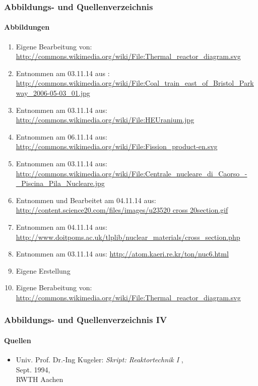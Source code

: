 \documentclass{beamer}[9pt]
\begin{document}
\begin{frame}[allowframebreaks]
\frametitle{Abbildungs- und Quellenverzeichnis}
\framesubtitle{Abbildungen}

  \begin{enumerate}
     \item Eigene Bearbeitung von:\\
     \url{http://commons.wikimedia.org/wiki/File:Thermal_reactor_diagram.svg}
     \item Entnommen am 03.11.14 aus : \\
     \url{http://commons.wikimedia.org/wiki/File:Coal_train_east_of_Bristol_Parkway_2006-05-03_01.jpg}
     \item Entnommen am 03.11.14 aus:\\
     \url{http://commons.wikimedia.org/wiki/File:HEUranium.jpg}
     \item Entnommen am 06.11.14 aus:
     \url{http://commons.wikimedia.org/wiki/File:Fission_product-en.svg}
     \item Entnommen am 03.11.14 aus:\\
     \url{http://commons.wikimedia.org/wiki/File:Centrale_nucleare_di_Caorso_-_Piscina_Pila_Nucleare.jpg}
     \item Entnommen und Bearbeitet am 04.11.14 aus:\\
     \url{http://content.science20.com/files/images/u23520 cross 20section.gif}
     \item Entnommen am 04.11.14 aus:
     \url{http://www.doitpoms.ac.uk/tlplib/nuclear_materials/cross_section.php}
     \item Entnommen am 03.11.14 aus:
     \url{http://atom.kaeri.re.kr/ton/nuc6.html}
     \item Eigene Erstellung
     \item Eigene Berabeitung von:
     \url{http://commons.wikimedia.org/wiki/File:Thermal_reactor_diagram.svg}
  \end{enumerate}
\end{frame}
\begin{frame}
\frametitle{Abbildungs- und Quellenverzeichnis IV}
\framesubtitle{Quellen}
\begin{itemize}
\item Univ. Prof. Dr.-Ing Kugeler: \textit{Skript: Reaktortechnik I} ,\\ Sept. 1994,\\RWTH Aachen
\end{itemize}
\end{frame}
\end{document}
